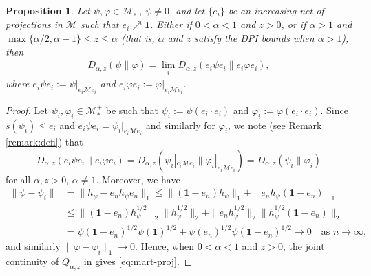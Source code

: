 \documentclass[12pt]{article}
\newtheorem{prop}[theorem]{Proposition}
\theoremstyle{definition}
\theoremstyle{remark}
\numberwithin{equation}{section}
\def\cM{\mathcal M}
\def\Me{\mathcal M}
\def\ffi{\varphi}
\def\1{\mathbf{1}}
\begin{document}
\begin{prop}\label{prop:mart-proj}
Let $\psi,\varphi\in \Me_*^+$, $\psi\ne 0$, and let $\{e_i\}$ be an increasing net of projections in $\Me$
such that $e_i\nearrow\1$. Either if $0<\alpha<1$ and $z>0$, or if $\alpha>1$ and
$\max\{\alpha/2,\alpha-1\}\le z\le \alpha$ (that is, $\alpha$ and $z$ satisfy the DPI bounds when
$\alpha>1$), then
\begin{align}\label{eq:mart-proj}
D_{\alpha,z}(\psi\|\ffi)=\lim_iD_{\alpha,z}(e_i\psi e_i\|e_i\ffi e_i),
\end{align}
where $e_i\psi e_i:=\psi|_{e_i\Me e_i}$ and $e_i\ffi e_i:=\ffi|_{e_i\Me e_i}$.
\end{prop}

\begin{proof}
Let $\psi_i,\ffi_i\in\cM_*^+$ be such that $\psi_i:=\psi(e_i\cdot e_i)$ and $\ffi_i:=\ffi(e_i\cdot e_i)$.
Since $s(\psi_i)\le e_i$ and $e_i\psi e_i=\psi_i|_{e_i\Me e_i}$ and similarly for $\ffi_i$, we note
(see Remark \ref{remark:defi}) that
\[
D_{\alpha,z}(e_i\psi e_i\|e_i\ffi e_i)
=D_{\alpha,z}(\psi_i|_{e_i\Me e_i}\|\ffi_i|_{e_i\Me e_i})=D_{\alpha,z}(\psi_i\|\ffi_i)
\]
for all $\alpha,z>0$, $\alpha\ne1$. Moreover, we have
\begin{align*}
\|\psi-\psi_i\|&=\|h_\psi-e_nh_\psi e_n\|_1\le\|(\1-e_n)h_\psi\|_1+\|e_nh_\psi(\1-e_n)\|_1 \\
&\le\|(\1-e_n)h_\psi^{1/2}\|_2\|h_\psi^{1/2}\|_2+\|e_nh_\psi^{1/2}\|_2\|h_\psi^{1/2}(\1-e_n)\|_2 \\
&=\psi(\1-e_n)^{1/2}\psi(\1)^{1/2}+\psi(e_n)^{1/2}\psi(\1-e_n)^{1/2}\to0\quad\mbox{as $n\to\infty$},
\end{align*}
and similarly $\|\ffi-\ffi_i\|_1\to0$. Hence, when $0<\alpha<1$ and $z>0$, the joint continuity of
$Q_{\alpha,z}$ in \cite[Theorem 1(iv)]{kato2023onrenyi} gives \eqref{eq:mart-proj}.


\end{proof}
\end{document}
